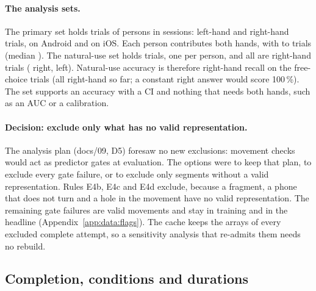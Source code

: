 \paragraph{The analysis sets.} The primary set holds  trials of
 persons in  sessions:  left-hand
and  right-hand trials,  on Android and
 on iOS. Each person contributes both hands, with  to
 trials (median ). The natural-use set
holds  trials, one per person, and all are right-hand trials
( right,  left). Natural-use accuracy is therefore
right-hand recall on the free-choice trials (all right-hand so far; a constant right answer would score
100\,\%). The set supports an accuracy with a CI and nothing that needs both hands, such as an AUC or a
calibration.

\paragraph{Decision: exclude only what has no valid representation.} The analysis plan (docs/09, D5) foresaw no
new exclusions: movement checks would act as predictor gates at evaluation. The options were to keep that plan,
to exclude every gate failure, or to exclude only segments without a valid representation. Rules E4b, E4c and
E4d exclude, because a fragment, a phone that does not turn and a hole in the movement have no valid
representation. The remaining gate failures are valid movements and stay in training and in the headline
(Appendix~\ref{app:data:flags}). The cache keeps the arrays of every excluded complete attempt, so a
sensitivity analysis that re-admits them needs no rebuild.



\subsection{Completion, conditions and durations}\label{app:data:completion}

